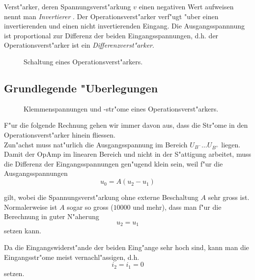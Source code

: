 \documentclass[german, 10pt, a4paper, headsepline]{scrreprt}
\theoremstyle{remark}
\begin{document}
Verst"arker, deren Spannungsverst"arkung $v$ einen negativen Wert aufweisen nennt man \textit{Invertierer} . Der Operationsverst"arker verf"ugt "uber einen invertierenden und einen nicht invertierenden Eingang. Die Ausgangsspannnung ist proportional zur Differenz der beiden Eingangsspannungen, d.h. der Operationsverst"arker ist ein \textit{Differenz\-ver\-st"arker}.

\begin{figure}[hbt]
 
 \centerline{\box\graph}
 \caption{Schaltung eines Operationsverst"arkers.}
 \label{opamp}
\end{figure}

\subsection{Grundlegende "Uberlegungen}

\begin{figure}[hbt]
 
 \centerline{\box\graph}
 \caption{Klemmenspannungen und -str"ome eines Operationsverst"arkers.}
 \label{opamp2}
\end{figure}

F"ur die folgende Rechnung gehen wir immer davon aus, dass die Str"ome in den Operationsverst"arker hinein fliessen. \\

Zun"achst muss nat"urlich die Ausgangsspannung im Bereich $U_{B^-}\ldots U_{B^+}$ liegen. Damit der OpAmp im linearen Bereich und nicht in der S"attigung arbeitet, muss die Differenz der Eingangsspannungen gen"ugend klein sein, weil f"ur die Ausgangsspannungen
\begin{displaymath}
	u_0 = A(u_2 - u_1)
\end{displaymath}

gilt, wobei die Spannungsverst"arkung ohne externe Beschaltung $A$ sehr gross ist. Normalerweise ist $A$ sogar so gross ($10000$ und mehr), dass man f"ur die Berechnung in guter N"aherung
\begin{displaymath}
	u_2 = u_1
\end{displaymath}
setzen kann.

Da die Eingangswiderst"ande der beiden Eing"ange sehr hoch sind, kann man die Eingangsstr"ome meist vernachl"assigen, d.h.
\begin{displaymath}
	i_2 = i_1 = 0
\end{displaymath}
setzen.\\
\end{document}
